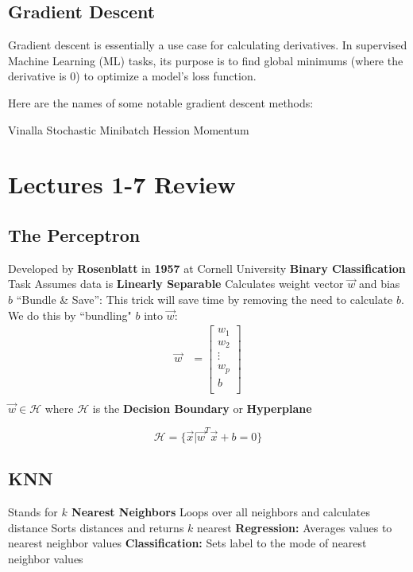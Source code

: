 \subsection{Gradient Descent}
Gradient descent is essentially a use case for calculating derivatives. In supervised Machine Learning (ML) tasks, its purpose is to find global minimums (where the derivative is 0) to optimize a model's loss function. 

Here are the names of some notable gradient descent methods:
\begin{outline}
    \1 Vinalla
    \1 Stochastic
    \1 Minibatch
    \1 Hession
    \1 Momentum

\end{outline}
\section{Lectures 1-7 Review}

\subsection{The Perceptron}
\begin{outline}
    \1 Developed by \textbf{Rosenblatt} in \textbf{1957} at Cornell University
    \1 \textbf{Binary Classification} Task
    \1 Assumes data is \textbf{Linearly Separable}
    \1 Calculates weight vector $\vec{w}$ and bias $b$ 
    \1 ``Bundle \& Save'': This trick will save time by removing the need to calculate $b$. We do this by ``bundling" $b$ into $\vec{w}$: 
    \begin{align*}
    \vec{w} &= \begin{bmatrix}
           w_{1}    \\
           w_{2}    \\
           \vdots   \\
           w_{p}    \\
           b        \\
         \end{bmatrix} \\
    \end{align*}
    \1 $\vec{w} \in \mathcal{H}$ where $\mathcal{H}$ is the \textbf{Decision Boundary} or \textbf{Hyperplane}
\end{outline}

\[
\mathcal{H} = \{\vec{x} | \vec{w}^T\vec{x} + b = 0\}
\]


\subsection{KNN}
\begin{outline}
    \1 Stands for \textbf{$k$ Nearest Neighbors}
    \1 Loops over all neighbors and calculates distance
    \1 Sorts distances and returns $k$ nearest
    \1 \textbf{Regression:} Averages values to nearest neighbor values
    \1 \textbf{Classification:} Sets label to the mode of nearest neighbor values
\end{outline}

